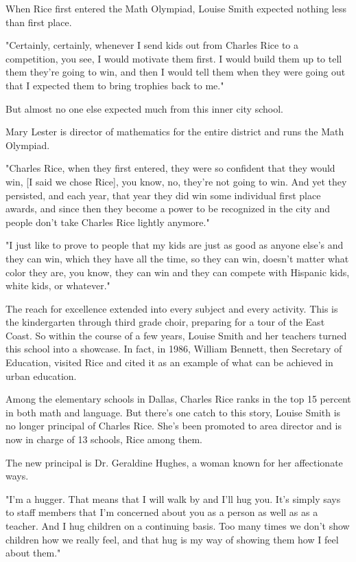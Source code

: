 When Rice first entered the Math Olympiad, Louise Smith expected nothing less than first place.

"Certainly, certainly, whenever I send kids out from Charles Rice to a competition, you see, I would motivate them first. I would build them up to tell them they're going to win, and then I would tell them when they were going out that I expected them to bring trophies back to me."

But almost no one else expected much from this inner city school.

Mary Lester is director of mathematics for the entire district and runs the Math Olympiad.

"Charles Rice, when they first entered, they were so confident that they would win, [I said we chose Rice], you know, no, they're not going to win. And yet they persisted, and each year, that year they did win some individual first place awards, and since then they become a power to be recognized in the city and people don't take Charles Rice lightly anymore."

"I just like to prove to people that my kids are just as good as anyone else's and they can win, which they have all the time, so they can win, doesn't matter what color they are, you know, they can win and they can compete with Hispanic kids, white kids, or whatever."

The reach for excellence extended into every subject and every activity. This is the kindergarten through third grade choir, preparing for a tour of the East Coast. So within the course of a few years, Louise Smith and her teachers turned this school into a showcase. In fact, in 1986, William Bennett, then Secretary of Education, visited Rice and cited it as an example of what can be achieved in urban education.

Among the elementary schools in Dallas, Charles Rice ranks in the top 15 percent in both math and language. But there's one catch to this story, Louise Smith is no longer principal of Charles Rice. She's been promoted to area director and is now in charge of 13 schools, Rice among them.

The new principal is Dr. Geraldine Hughes, a woman known for her affectionate ways.

"I'm a hugger. That means that I will walk by and I'll hug you. It's simply says to staff members that I'm concerned about you as a person as well as as a teacher. And I hug children on a continuing basis. Too many times we don't show children how we really feel, and that hug is my way of showing them how I feel about them."

